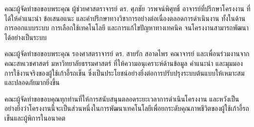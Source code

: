 
คณะผู้จัดทำขอขอบพระคุณ ผู้ช่วยศาสตราจารย์ ดร. ศุภชัย วรพจน์พิศุทธิ์ อาจารย์ที่ปรึกษาโครงงาน ที่ได้ให้คำแนะนำ ข้อเสนอแนะ และคำปรึกษาทางวิชาการอย่างต่อเนื่องตลอดการดำเนินงาน ทั้งในด้านการออกแบบระบบ การเลือกใช้เทคโนโลยี และการแก้ไขปัญหาทางเทคนิค จนโครงงานสามารถพัฒนาได้อย่างเป็นระบบ

คณะผู้จัดทำขอขอบพระคุณ รองศาสตราจารย์ ดร. สายรัก สอาดไพร คณาจารย์ และเพื่อนร่วมงานจากคณะสหเวชศาสตร์ มหาวิทยาลัยธรรมศาสตร์ ที่ให้ความอนุเคราะห์ด้านข้อมูล คำแนะนำ และมุมมองการใช้งานจริงของผู้ใช้เก้าอี้รถเข็น ซึ่งเป็นประโยชน์อย่างยิ่งต่อการปรับปรุงระบบต้นแบบให้เหมาะสมและปลอดภัยมากยิ่งขึ้น

คณะผู้จัดทำขอขอบคุณทุกท่านที่ให้การสนับสนุนตลอดระยะเวลาการดำเนินโครงงาน และหวังเป็นอย่างยิ่งว่าโครงงานนี้จะเป็นส่วนหนึ่งในการพัฒนาเทคโนโลยีเพื่อยกระดับคุณภาพชีวิตของผู้ใช้เก้าอี้รถเข็นและผู้พิการในอนาคต
